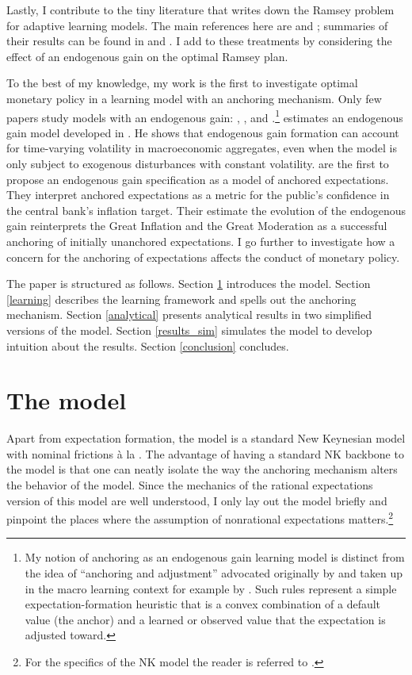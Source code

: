 \documentclass[11pt]{article}
\renewcommand{\[}{\begin{equation}}
\renewcommand{\]}{\end{equation}}
\begin{document}
Lastly, I contribute to the tiny literature that writes down the Ramsey problem for adaptive learning models. The main references here are \cite{molnar2014optimal} and \cite{mele2019perils}; summaries of their results can be found in  \cite{eusepi2018science} and \cite{gaspar2010inflation}. I add to these treatments by considering the effect of an endogenous gain on the optimal Ramsey plan.

To the best of my knowledge, my work is the first to investigate optimal monetary policy in a learning model with an anchoring mechanism. Only few papers study models with an endogenous gain: \cite{marcet2003recurrent}, \cite{milani2014learning}, and \cite{carvalho2019anchored}.\footnote{My notion of anchoring as an endogenous gain learning model is distinct from the idea of ``anchoring and adjustment'' advocated originally by \cite{tversky1974judgment} and taken up in the macro learning context for example by \cite{anufriev2012evolutionary}. Such rules represent a simple expectation-formation heuristic that is a convex combination of a default value (the anchor) and a learned or observed value that the expectation is adjusted toward.} \cite{milani2014learning} estimates an endogenous gain model developed in \cite{marcet2003recurrent}. He shows that endogenous gain formation can account for time-varying volatility in macroeconomic aggregates, even when the model is only subject to exogenous disturbances with constant volatility. \cite{carvalho2019anchored} are the first to propose an endogenous gain specification as a model of anchored expectations. They interpret anchored expectations as a metric for the public's confidence in the central bank's inflation target. Their estimate the evolution of the endogenous gain reinterprets the Great Inflation and the Great Moderation as a  successful anchoring of initially unanchored expectations. I go further to investigate how a concern for the anchoring of expectations affects the conduct of monetary policy.

The paper is structured as follows. Section \ref{NK} introduces the model. Section \ref{learning} describes the learning framework and spells out the anchoring mechanism. Section \ref{analytical} presents analytical results in two simplified versions of the model. Section \ref{results_sim} simulates the model to develop intuition about the results. Section \ref{conclusion} concludes.

\section{The model}\label{NK}
Apart from expectation formation, the model is a standard New Keynesian model with nominal frictions \`a la \cite{calvo1983staggered}. The advantage of having a standard NK backbone to the model is that one can neatly isolate the way the anchoring mechanism alters the behavior of the model. Since the mechanics of the rational expectations version of this model are well understood, I only lay out the model briefly and pinpoint the places where the assumption of nonrational expectations matters.\footnote{For the specifics of the NK model the reader is referred to \cite{woodford2011interest}.}
\end{document}
